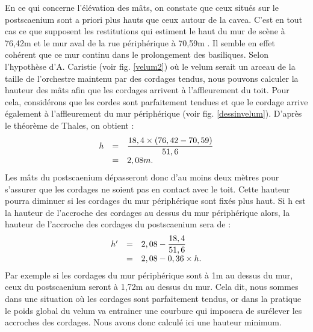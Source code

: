 En ce qui concerne l'élévation des mâts, on constate que ceux situés sur le \gls{postscaenium} sont a priori plus hauts que ceux autour de la \gls{cavea}. C'est en tout cas ce que supposent les restitutions qui estiment le haut du mur de scène à 76,42m et le mur aval de la rue périphérique à 70,59m \cite[Pl. XLVIII et XLIX]{orangePl}. Il semble en effet cohérent que ce mur continu dans le prolongement des \glspl{basilique}. Selon l'hypothèse d'A. Caristie (voir fig. \ref{velum2}) où le \gls{velum} serait un arceau de la taille de l'orchestre maintenu par des cordages tendus, nous pouvons calculer la hauteur des mâts afin que les cordages arrivent à l'affleurement du toit. Pour cela, considérons que les cordes sont parfaitement tendues et que le cordage arrive également à l'affleurement du mur périphérique (voir fig. \ref{dessinvelum}). D'après le théorème de Thales, on obtient :
%
\begin{equation}
	\begin{array}{r c l}
		h & = & \displaystyle{\frac{18,4\times(76,42-70,59)}{51,6}} \\
		 & = & 2, 08m.
	\end{array}
\end{equation}
%
Les mâts du \gls{postscaenium} dépasseront donc d'au moins deux mètres pour s'assurer que les cordages ne soient pas en contact avec le toit. Cette hauteur pourra diminuer si les cordages du mur périphérique sont fixés plus haut. Si h est la hauteur de l'accroche des cordages au dessus du mur périphérique alors, la hauteur de l'accroche des cordages du \gls{postscaenium} sera de :
%
\begin{equation}
	\begin{array}{r c l}
		h' & = & 2,08 - \displaystyle{\frac{18,4}{51,6}} \\
		& = & 2, 08 - 0,36 \times h.
	\end{array}
\end{equation}
%
Par exemple si les cordages du mur périphérique sont à 1m au dessus du mur, ceux du \gls{postscaenium} seront à 1,72m au dessus du mur. Cela dit, nous sommes dans une situation où les cordages sont parfaitement tendus, or dans la pratique le poids global du velum va entrainer une courbure qui imposera de surélever les accroches des cordages. Nous avons donc calculé ici une hauteur minimum. 
